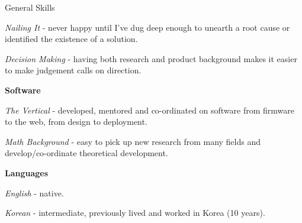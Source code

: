 \documentclass[a4paper,10pt]{article}
\begin{document}
\begin{cvsection}{General Skills}
\begin{djs_itemize}
    \begin{djs_itemize}
      \item \textit{Nailing It} - never happy until I've dug deep enough to unearth a root cause or identified the existence of a solution.
      \item \textit{Decision Making} - having both research and product background makes it easier to make judgement calls on direction.
    \end{djs_itemize}
    \item \textbf{Software}
    \begin{djs_itemize}
      \item \textit{The Vertical} - developed, mentored and co-ordinated on software from firmware to the web, from design to deployment.
      \item \textit{Math Background} - easy to pick up new research from many fields and develop/co-ordinate theoretical development.
    \end{djs_itemize}
    \item \textbf{Languages}
    \begin{djs_itemize}
      \item \textit{English} - native.
      \item \textit{Korean} - intermediate, previously lived and worked in Korea (10 years).
    \end{djs_itemize}
  \end{djs_itemize}
\end{cvsection}

\vspace{2em}
\end{document}
